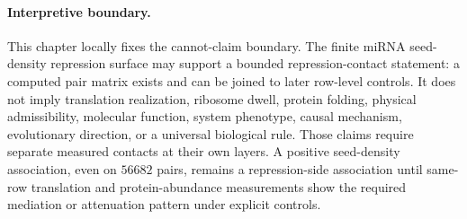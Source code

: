 \paragraph{Interpretive boundary.}
This chapter locally fixes the cannot-claim boundary.  The finite miRNA seed-density repression surface may support a bounded repression-contact statement: a computed pair matrix exists and can be joined to later row-level controls.  It does not imply translation realization, ribosome dwell, protein folding, physical admissibility, molecular function, system phenotype, causal mechanism, evolutionary direction, or a universal biological rule.  Those claims require separate measured contacts at their own layers.  A positive seed-density association, even on $56682$ pairs, remains a repression-side association until same-row translation and protein-abundance measurements show the required mediation or attenuation pattern under explicit controls.